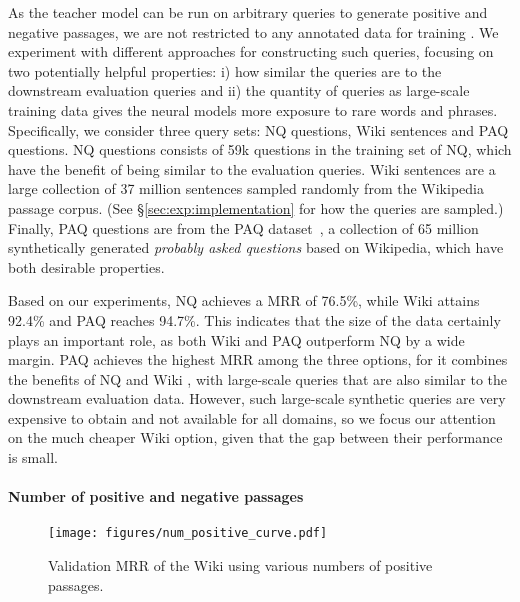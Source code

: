 \documentclass[11pt]{article}
\newcommand{\lexmodelsymbol}{\xspace}
\newcommand{\secref}[1]{\S\ref{#1}}
\begin{document}
As the teacher model can be run on arbitrary queries to generate positive and negative passages, we are not restricted to any annotated data for training \lexmodelsymbol{}.
We experiment with different approaches for constructing such queries, focusing on two potentially helpful properties: i) how similar the queries are to the downstream evaluation queries and ii) the quantity of queries as large-scale training data gives the neural models more exposure to rare words and phrases.
Specifically, we consider three query sets: NQ questions, Wiki sentences and PAQ questions.
NQ questions consists of 59k questions in the training set of NQ, which have the benefit of being similar to the evaluation queries.
Wiki sentences are a large collection of 37 million sentences sampled randomly from the Wikipedia passage corpus. (See \secref{sec:exp:implementation} for how the queries are sampled.)
Finally, PAQ questions are from the PAQ dataset~\cite{lewis2021paq}, a collection of 65 million synthetically generated \emph{probably asked questions} based on Wikipedia, which have both desirable properties.

Based on our experiments, NQ \lexmodelsymbol{} achieves a MRR of 76.5\%, while Wiki \lexmodelsymbol{} attains 92.4\% and PAQ \lexmodelsymbol{} reaches 94.7\%.
This indicates that the size of the data certainly plays an important role, as both Wiki \lexmodelsymbol{} and PAQ \lexmodelsymbol{} outperform NQ \lexmodelsymbol{} by a wide margin.
PAQ \lexmodelsymbol{} achieves the highest MRR among the three options, for it combines the benefits of NQ and Wiki \lexmodelsymbol{}, with large-scale queries that are also similar to the downstream evaluation data.
However, such large-scale synthetic queries are very expensive to obtain and not available for all domains, so we focus our attention on the much cheaper Wiki \lexmodelsymbol{} option, given that the gap between their performance is small.

\paragraph{Number of positive and negative passages}

\begin{figure}[t]
    \centering
    \texttt{[image: figures/num\_positive\_curve.pdf]}
    \caption{Validation MRR of the Wiki \lexmodelsymbol{} using various numbers of positive passages.}
    \label{fig:num_positive}
\end{figure}
\end{document}
